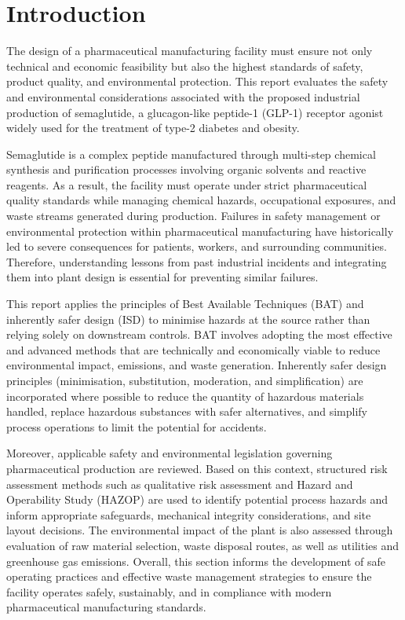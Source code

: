 \section{Introduction}

The design of a pharmaceutical manufacturing facility must ensure not only technical and economic feasibility but also the highest standards of safety, product quality, and environmental protection. This report evaluates the safety and environmental considerations associated with the proposed industrial production of semaglutide, a glucagon-like peptide-1 (GLP-1) receptor agonist widely used for the treatment of type-2 diabetes and obesity.

Semaglutide is a complex peptide manufactured through multi-step chemical synthesis and purification processes involving organic solvents and reactive reagents. As a result, the facility must operate under strict pharmaceutical quality standards while managing chemical hazards, occupational exposures, and waste streams generated during production. Failures in safety management or environmental protection within pharmaceutical manufacturing have historically led to severe consequences for patients, workers, and surrounding communities. Therefore, understanding lessons from past industrial incidents and integrating them into plant design is essential for preventing similar failures.

This report applies the principles of Best Available Techniques (BAT) \cite{EU_IED_2010} and inherently safer design (ISD) \cite{Yang_ISD_2018} to minimise hazards at the source rather than relying solely on downstream controls. BAT involves adopting the most effective and advanced methods that are technically and economically viable to reduce environmental impact, emissions, and waste generation. Inherently safer design principles (minimisation, substitution, moderation, and simplification) are incorporated where possible to reduce the quantity of hazardous materials handled, replace hazardous substances with safer alternatives, and simplify process operations to limit the potential for accidents.

Moreover, applicable safety and environmental legislation governing pharmaceutical production are reviewed. Based on this context, structured risk assessment methods such as qualitative risk assessment and Hazard and Operability Study (HAZOP) are used to identify potential process hazards and inform appropriate safeguards, mechanical integrity considerations, and site layout decisions. The environmental impact of the plant is also assessed through evaluation of raw material selection, waste disposal routes, as well as utilities and greenhouse gas emissions. Overall, this section informs the development of safe operating practices and effective waste management strategies to ensure the facility operates safely, sustainably, and in compliance with modern pharmaceutical manufacturing standards.
